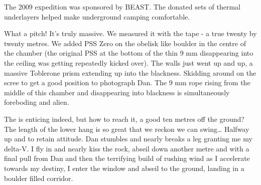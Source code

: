 \begin{pagefigure}
\checkoddpage \ifoddpage \forcerectofloat \else \forceversofloat \fi
\centering
 \caption{The 2009 expedition was sponsored by BEAST. The donated sets of thermal underlayers helped make underground camping comfortable. }
 \label{beast thermals}
\end{pagefigure}


What a pitch! It's truly massive. We measured it with the tape - a true
twenty by twenty metres. We added PSS Zero on the obelisk like boulder
in the centre of the chamber (the original PSS at the bottom of the thin
9 mm disappearing into the ceiling was getting repeatedly kicked over).
The walls just went up and up, a massive Toblerone prism extending up
into the blackness. Skidding around on the scree to get a good position
to photograph Dan. The 9 mm rope rising from the middle of this chamber
and disappearing into blackness is simultaneously foreboding and alien.

The  is enticing indeed, but how to reach it, a good
ten metres off the ground? The length of the lower hang is so great that
we reckon we can swing\ldots{} Halfway up and  to retain attitude. Dan stumbles and nearly breaks a leg granting
me my delta-V. I fly in and nearly kiss the rock, abseil down another
metre and with a final pull from Dan and then the terrifying build of
rushing wind as I accelerate towards my destiny, I enter the window and
abseil to the ground, landing in a boulder filled corridor.

